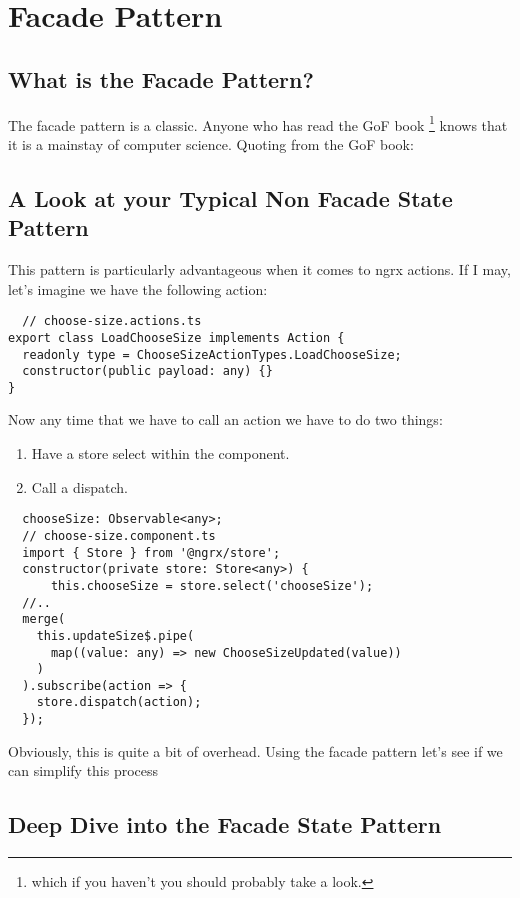 \maketitle{}
\section{ Facade Pattern }

\subsection{ What is the Facade Pattern? }
The facade pattern is a classic. Anyone who has read the GoF book \footnote{
which if you haven't you should probably take a look.} knows that it is a
mainstay of computer science. Quoting from the GoF book:


\subsection{ A Look at your Typical Non Facade State Pattern  }
This pattern is particularly advantageous when it comes to ngrx actions. If I
may, let's imagine we have the following action:

\begin{lstlisting}
  // choose-size.actions.ts
export class LoadChooseSize implements Action {
  readonly type = ChooseSizeActionTypes.LoadChooseSize;
  constructor(public payload: any) {}
}
\end{lstlisting}

Now any time that we have to call an action we have to do two things:
\begin{enumerate}
  \item Have a store select within the component.
  \item Call a dispatch.
\end{enumerate}

\begin{lstlisting}
  chooseSize: Observable<any>;
  // choose-size.component.ts
  import { Store } from '@ngrx/store';
  constructor(private store: Store<any>) {
      this.chooseSize = store.select('chooseSize');
  //..
  merge(
    this.updateSize$.pipe(
      map((value: any) => new ChooseSizeUpdated(value))
    )
  ).subscribe(action => {
    store.dispatch(action);
  });
\end{lstlisting}

Obviously, this is quite a bit of overhead. Using the facade pattern let's see
if we can simplify this process

\subsection{ Deep Dive into the Facade State Pattern  }
